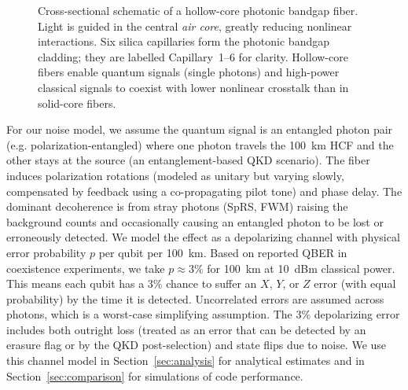 \documentclass[conference]{IEEEtran}  %
\begin{document}
\begin{figure}[t]
    \centering
    \caption{Cross-sectional schematic of a hollow-core photonic bandgap fiber.  Light is guided in the central \emph{air core}, greatly reducing nonlinear interactions.  Six silica capillaries form the photonic bandgap cladding; they are labelled Capillary~1--6 for clarity.  Hollow-core fibers enable quantum signals (single photons) and high-power classical signals to coexist with lower nonlinear crosstalk than in solid-core fibers.}
    \label{fig:hcf}
\end{figure}

For our noise model, we assume the quantum signal is an entangled photon pair (e.g. polarization-entangled) where one photon travels the 100~km HCF and the other stays at the source (an entanglement-based QKD scenario). The fiber induces polarization rotations (modeled as unitary but varying slowly, compensated by feedback using a co-propagating pilot tone) and phase delay. The dominant decoherence is from stray photons (SpRS, FWM) raising the background counts and occasionally causing an entangled photon to be lost or erroneously detected. We model the effect as a depolarizing channel with physical error probability $p$ per qubit per 100~km. Based on reported QBER in coexistence experiments, we take $p\approx 3\%$ for 100~km at 10~dBm classical power. This means each qubit has a 3\% chance to suffer an $X$, $Y$, or $Z$ error (with equal probability) by the time it is detected. Uncorrelated errors are assumed across photons, which is a worst-case simplifying assumption. The 3\% depolarizing error includes both outright loss (treated as an error that can be detected by an erasure flag or by the QKD post-selection) and state flips due to noise. We use this channel model in Section~\ref{sec:analysis} for analytical estimates and in Section~\ref{sec:comparison} for simulations of code performance.
\end{document}
